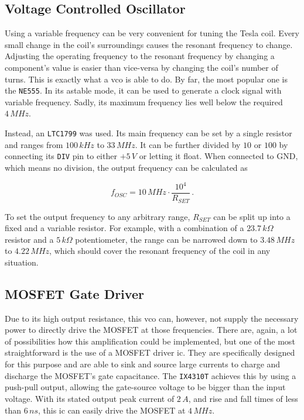 \subsection{Voltage Controlled Oscillator}

Using a variable frequency can be very convenient for tuning the Tesla coil. Every small change in the coil's surroundings causes the resonant frequency to change. Adjusting the operating frequency to the resonant frequency by changing a component's value is easier than vice-versa by changing the coil's number of turns. This is exactly what a \gls{vco} is able to do. By far, the most popular one is the \texttt{NE555}. In its astable mode, it can be used to generate a clock signal with variable frequency. Sadly, its maximum frequency lies well below the required \(4\,MHz\).

Instead, an \texttt{LTC1799} was used. Its main frequency can be set by a single resistor and ranges from \(100\,kHz\) to \(33\,MHz\). It can be further divided by \(10\) or \(100\) by connecting its \texttt{DIV} pin to either \(+5\,V\) or letting it float. When connected to GND, which means no division, the output frequency can be calculated as

\begin{equation}
    f_{OSC} = 10\,MHz \cdot \frac{10^4}{R_{SET}}\,.
\end{equation}

To set the output frequency to any arbitrary range, \(R_{SET}\) can be split up into a fixed and a variable resistor. For example, with a combination of a \(23.7\,k\Omega\) resistor and a \(5\,k\Omega\) potentiometer, the range can be narrowed down to \(3.48\,MHz\) to \(4.22\,MHz\), which should cover the resonant frequency of the coil in any situation.

\subsection{MOSFET Gate Driver}

Due to its high output resistance, this \gls{vco} can, however, not supply the necessary power to directly drive the MOSFET at those frequencies. There are, again, a lot of possibilities how this amplification could be implemented, but one of the most straightforward is the use of a MOSFET driver \gls{ic}. They are specifically designed for this purpose and are able to sink and source large currents to charge and discharge the MOSFET's gate capacitance. The \texttt{IX4310T} achieves this by using a push-pull output, allowing the gate-source voltage to be bigger than the input voltage. With its stated output peak current of \(2\,A\), and rise and fall times of less than \(6\,ns\), this \gls{ic} can easily drive the MOSFET at \(4\,MHz\).


